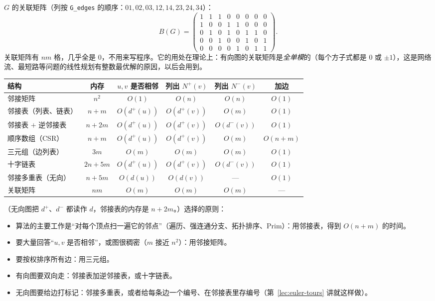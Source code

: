 $G$ 的关联矩阵（列按 \texttt{G\_edges} 的顺序：$01,02,03,12,14,23,24,34$）：
\[
B(G)=\begin{pmatrix}
1&1&1&0&0&0&0&0\\
1&0&0&1&1&0&0&0\\
0&1&0&1&0&1&1&0\\
0&0&1&0&0&1&0&1\\
0&0&0&0&1&0&1&1
\end{pmatrix}.
\]
关联矩阵有 $nm$ 格，几乎全是 $0$，不用来写程序。它的用处在理论上：有向图的关联矩阵是\emph{全单模}的（每个方子式都是 $0$ 或 $\pm1$），这是网络流、最短路等问题的线性规划有整数最优解的原因，以后会用到。


\begin{center}
\small
\begin{tabular}{lccccc}
\toprule
结构 & 内存 & $u,v$ 是否相邻 & 列出 $N^+(v)$ & 列出 $N^-(v)$ & 加边 \\
\midrule
邻接矩阵 & $n^2$ & $O(1)$ & $O(n)$ & $O(n)$ & $O(1)$ \\
邻接表（列表、链表） & $n+m$ & $O(d^+(u))$ & $O(d^+(v))$ & $O(m)$ & $O(1)$ \\
邻接表 $+$ 逆邻接表 & $n+2m$ & $O(d^+(u))$ & $O(d^+(v))$ & $O(d^-(v))$ & $O(1)$ \\
顺序数组（CSR） & $n+m$ & $O(d^+(u))$ & $O(d^+(v))$ & $O(m)$ & $O(n+m)$ \\
三元组（边列表） & $3m$ & $O(m)$ & $O(m)$ & $O(m)$ & $O(1)$ \\
十字链表 & $2n+5m$ & $O(d^+(u))$ & $O(d^+(v))$ & $O(d^-(v))$ & $O(1)$ \\
邻接多重表（无向） & $n+5m$ & $O(d(u))$ & $O(d(v))$ & — & $O(1)$ \\
关联矩阵 & $nm$ & $O(m)$ & $O(m)$ & $O(m)$ & — \\
\bottomrule
\end{tabular}
\end{center}

（无向图把 $d^+$、$d^-$ 都读作 $d$，邻接表的内存是 $n+2m$。）选择的原则：
\begin{itemize}
\item 算法的主要工作是“对每个顶点扫一遍它的邻点”（遍历、强连通分支、拓扑排序、Prim）：用邻接表，得到 $O(n+m)$ 的时间。
\item 要大量回答“$u,v$ 是否相邻”，或图很稠密（$m$ 接近 $n^2$）：用邻接矩阵。
\item 要按权排序所有边：用三元组。
\item 有向图要双向走：邻接表加逆邻接表，或十字链表。
\item 无向图要给边打标记：邻接多重表，或者给每条边一个编号、在邻接表里存编号（第~\ref{lec:euler-tours} 讲就这样做）。
\end{itemize}

